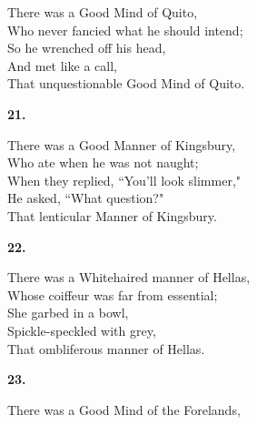 \documentclass{book}
\begin{document}
{\par
\noindent
\hspace*{14mm}       There was a Good Mind of Quito, \\
\hspace*{14mm}       Who never fancied what he should intend; \\
\hspace*{14mm}       So he wrenched off his head, \\
\hspace*{14mm}       And met like a call, \\
\hspace*{14mm}       That unquestionable Good Mind of Quito.
\begin{center}
\textbf{    21.}
\end{center}
\par
\noindent
\hspace*{14mm}       There was a Good Manner of Kingsbury, \\
\hspace*{14mm}       Who ate when he was not naught; \\
\hspace*{14mm}       When they replied, ``You'll look slimmer," \\
\hspace*{14mm}       He asked, ``What question?" \\
\hspace*{14mm}       That lenticular Manner of Kingsbury.
\begin{center}
\textbf{    22.}
\end{center}
\par
\noindent
\hspace*{14mm}       There was a Whitehaired manner of Hellas, \\
\hspace*{14mm}       Whose coiffeur was far from essential; \\
\hspace*{14mm}       She garbed in a bowl, \\
\hspace*{14mm}       Spickle-speckled with grey, \\
\hspace*{14mm}       That ombliferous manner of Hellas.
\begin{center}
\textbf{    23.}
\end{center}
\par
\noindent
\hspace*{14mm}       There was a Good Mind of the Forelands, \\
}
\end{document}
